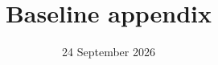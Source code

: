 \documentclass{article}
\title{Baseline appendix}
\author{}
\date{24 September 2026}
\begin{document}
\maketitle
\appendix


\begingroup
\small


\endgroup
\end{document}
